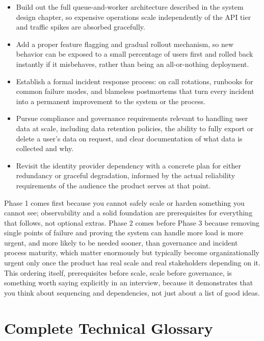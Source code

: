 \documentclass[11pt,a4paper]{report}
\begin{document}
\begin{itemize}[leftmargin=*]
\item Build out the full queue-and-worker architecture described in the system design chapter, so expensive operations scale independently of the API tier and traffic spikes are absorbed gracefully.
\item Add a proper feature flagging and gradual rollout mechanism, so new behavior can be exposed to a small percentage of users first and rolled back instantly if it misbehaves, rather than being an all-or-nothing deployment.
\item Establish a formal incident response process: on call rotations, runbooks for common failure modes, and blameless postmortems that turn every incident into a permanent improvement to the system or the process.
\item Pursue compliance and governance requirements relevant to handling user data at scale, including data retention policies, the ability to fully export or delete a user's data on request, and clear documentation of what data is collected and why.
\item Revisit the identity provider dependency with a concrete plan for either redundancy or graceful degradation, informed by the actual reliability requirements of the audience the product serves at that point.
\end{itemize}

\begin{notebox}
Phase 1 comes first because you cannot safely scale or harden something you cannot see; observability and a solid foundation are prerequisites for everything that follows, not optional extras. Phase 2 comes before Phase 3 because removing single points of failure and proving the system can handle more load is more urgent, and more likely to be needed sooner, than governance and incident process maturity, which matter enormously but typically become organizationally urgent only once the product has real scale and real stakeholders depending on it. This ordering itself, prerequisites before scale, scale before governance, is something worth saying explicitly in an interview, because it demonstrates that you think about sequencing and dependencies, not just about a list of good ideas.
\end{notebox}

\chapter{Complete Technical Glossary}
\end{document}
